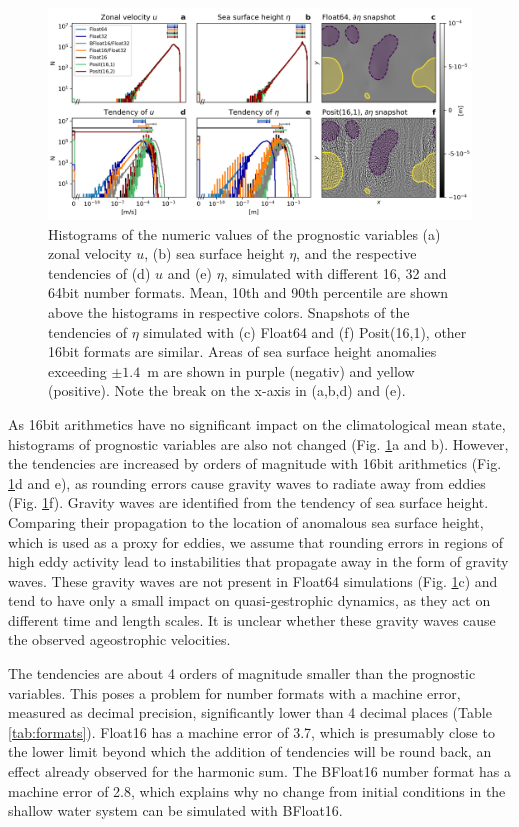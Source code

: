 \documentclass[draft]{agujournal2019}
\begin{document}
\begin{figure}
\includegraphics[width=1\textwidth]{../plots/tendency_hist.png}
\caption{Histograms of the numeric values of the prognostic variables (a) zonal velocity $u$, (b) sea surface height $\eta$, and the respective tendencies of (d) $u$ and (e) $\eta$, simulated with different 16, 32 and 64bit number formats. Mean, 10th and 90th percentile are shown above the histograms in respective colors. Snapshots of the tendencies of $\eta$ simulated with (c) Float64 and (f) Posit(16,1), other 16bit formats are similar. Areas of sea surface height anomalies exceeding $\pm1.4$~m are shown in purple (negativ) and yellow (positive). Note the break on the x-axis in (a,b,d) and (e).}
\label{fig:tend}
\end{figure}

As 16bit arithmetics have no significant impact on the climatological mean state, histograms of prognostic variables are also not changed (Fig. \ref{fig:tend}a and b). However, the tendencies are increased by orders of magnitude with 16bit arithmetics (Fig. \ref{fig:tend}d and e), as rounding errors cause gravity waves to radiate away from eddies (Fig. \ref{fig:tend}f). Gravity waves are identified from the tendency of sea surface height. Comparing their propagation to the location of anomalous sea surface height, which is used as a proxy for eddies, we assume that rounding errors in regions of high eddy activity lead to instabilities that propagate away in the form of gravity waves. These gravity waves are not present in Float64 simulations (Fig. \ref{fig:tend}c) and tend to have only a small impact on quasi-gestrophic dynamics, as they act on different time and length scales. It is unclear whether these gravity waves cause the observed ageostrophic velocities. 

The tendencies are about 4 orders of magnitude smaller than the prognostic variables. This poses a problem for number formats with a machine error, measured as decimal precision, significantly lower than 4 decimal places (Table \ref{tab:formats}). Float16 has a machine error of 3.7, which is presumably close to the lower limit beyond which the addition of tendencies will be round back, an effect already observed for the harmonic sum. The BFloat16 number format has a machine error of 2.8, which explains why no change from initial conditions in the shallow water system can be simulated with BFloat16.
\end{document}
